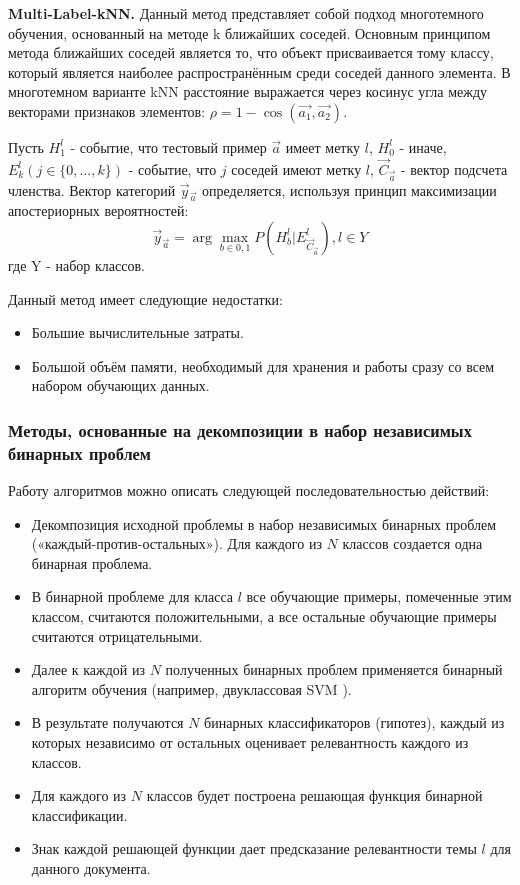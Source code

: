 \documentclass[russian, utf8, emptystyle]{eskdtext}
\begin{document}
{\bf Multi-Label-kNN.} Данный метод представляет собой подход многотемного обучения, основанный на методе k ближайших соседей.
Основным принципом метода ближайших соседей является то, что объект присваивается тому классу, который является наиболее распространённым среди соседей данного элемента.
В многотемном варианте kNN расстояние выражается через косинус угла между векторами признаков элементов: $\rho = 1 - \cos(\vec{a_1}, \vec{a_2})$.


Пусть $H^l_{1}$ - событие, что тестовый пример $\vec{a}$ имеет метку $l$,  $H^l_{0}$ - иначе, $E^l_k(j \in \{0,\ldots,k\})$ - событие, что $j$ соседей имеют метку $l$, ${\vec{C}_{\vec{a}}}$ - вектор подсчета членства. Вектор категорий ${\vec{y}_{\vec{a}}}$ определяется, используя принцип максимизации апостериорных вероятностей:
$${\vec{y}_{\vec{a}}} = \arg \max_{b \in {0,1}}P(H^l_b|E^l_{{\vec{C}_{\vec{a}}}}), l \in Y$$ где Y - набор классов.

Данный метод имеет следующие недостатки:
\begin{itemize}
	\item Большие вычислительные затраты.
	\item Большой объём памяти, необходимый для хранения и работы сразу со всем набором обучающих данных.
\end{itemize}
\subsubsection{Методы, основанные на декомпозиции в набор независимых бинарных проблем}
Работу алгоритмов можно описать следующей последовательностью действий:
\begin{itemize}
	\item Декомпозиция исходной проблемы  в набор независимых бинарных проблем («каждый-против-остальных»). Для каждого из $N$ классов создается одна бинарная проблема.
	\item В бинарной проблеме для класса $l$  все обучающие примеры, помеченные этим классом, считаются положительными, а все остальные обучающие примеры считаются отрицательными.
	\item Далее к каждой из $N$ полученных бинарных проблем применяется бинарный алгоритм обучения (например, двуклассовая SVM \cite{SVM}).
	\item В результате получаются $N$  бинарных классификаторов (гипотез), каждый из которых независимо от остальных оценивает релевантность каждого из   классов.
	\item Для каждого из $N$ классов будет построена решающая функция  бинарной классификации.
	\item Знак каждой решающей функции дает предсказание релевантности темы $l$ для данного документа.
\end{itemize}
	
\end{document}
